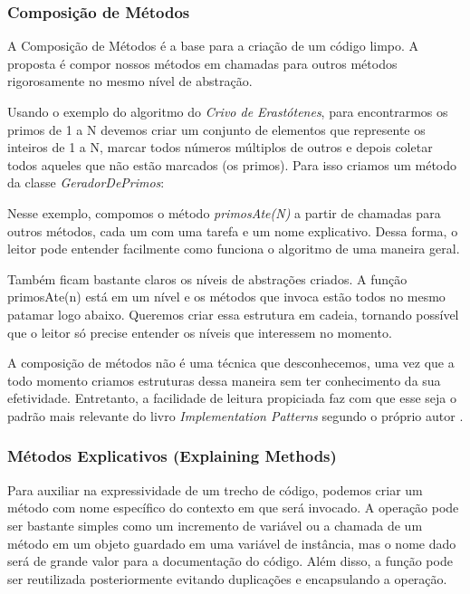 \subsubsection{Composição de Métodos}
\label{metodos:composicao}
A Composição de Métodos é a base para a criação de um código limpo. A proposta é compor nossos métodos em chamadas para outros métodos rigorosamente no mesmo nível de abstração.
	
Usando o exemplo do algoritmo do \textit{Crivo de Erastótenes}, para encontrarmos os primos de 1 a N devemos criar um conjunto de elementos que represente os inteiros de 1 a N, marcar todos números múltiplos de outros e depois coletar todos aqueles que não estão marcados (os primos). Para isso criamos um método da classe \textit{GeradorDePrimos}:



Nesse exemplo, compomos o método \textit{primosAte(N)} a partir de chamadas para outros métodos, cada um com uma tarefa e um nome explicativo. Dessa forma, o leitor pode entender facilmente como funciona o algoritmo de uma maneira geral. 
	
Também ficam bastante claros os níveis de abstrações criados. A função primosAte(n) está em um nível e os métodos que invoca estão todos no mesmo patamar logo abaixo. Queremos criar essa estrutura em cadeia, tornando possível que o leitor só precise entender os níveis que interessem no momento.
	
A composição de métodos não é uma técnica que desconhecemos, uma vez que a todo momento criamos estruturas dessa maneira sem ter conhecimento da sua efetividade. Entretanto, a facilidade de leitura propiciada faz com que esse seja o padrão mais relevante do livro \textit{Implementation Patterns} segundo o próprio autor \citep{Beck2007, InfoQ2008}.

\subsubsection{Métodos Explicativos (Explaining Methods)}
\label{metodos:explicativos}
Para auxiliar na expressividade de um trecho de código, podemos criar um método com nome específico do contexto em que será invocado. A operação pode ser bastante simples como um incremento de variável ou a chamada de um método em um objeto guardado em uma variável de instância, mas o nome dado será de grande valor para a documentação do código. Além disso, a função pode ser reutilizada posteriormente evitando duplicações e encapsulando a operação.
	
